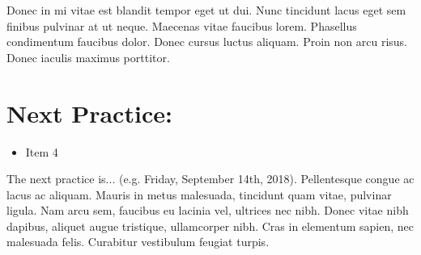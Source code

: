 \documentclass[12pt]{article}
\begin{document}
Donec in mi vitae est blandit tempor eget ut dui. Nunc tincidunt lacus eget sem finibus pulvinar at ut neque. Maecenas vitae faucibus lorem. Phasellus condimentum faucibus dolor. Donec cursus luctus aliquam. Proin non arcu risus. Donec iaculis maximus porttitor.

\section{Next Practice:}
\begin{itemize}
	\item Item 4
\end{itemize}

The next practice is... (e.g. Friday, September 14th, 2018). %
Pellentesque congue ac lacus ac aliquam. Mauris in metus malesuada, tincidunt quam vitae, pulvinar ligula. Nam arcu sem, faucibus eu lacinia vel, ultrices nec nibh. Donec vitae nibh dapibus, aliquet augue tristique, ullamcorper nibh. Cras in elementum sapien, nec malesuada felis. Curabitur vestibulum feugiat turpis.
\end{document}
